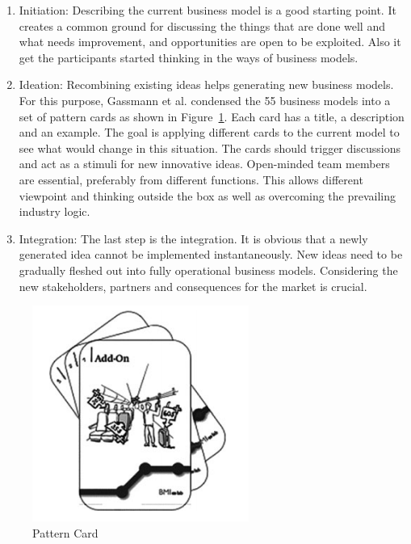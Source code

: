		\begin{enumerate}					
			\item Initiation: Describing the current business model is a good starting point. It creates a common ground for discussing the things that are done well and what needs improvement, and opportunities are open to be exploited. Also it get the participants started thinking in the ways of business models.

			\item Ideation: Recombining existing ideas helps generating new business models. For this purpose, Gassmann et al. condensed the 55 business models into a set of pattern cards as shown in Figure~\ref{fig:pattern_card}. Each card has a title, a description and an example. The goal is applying different cards to the current model to see what would change in this situation. The cards should trigger discussions and act as a stimuli for new innovative ideas. Open-minded team members are essential, preferably from different functions. This allows different viewpoint and thinking outside the box as well as overcoming the prevailing industry logic.
			
			\item Integration: The last step is the integration. It is obvious that a newly generated idea cannot be implemented instantaneously. New ideas need to be gradually fleshed out into fully operational business models. Considering the new stakeholders, partners and consequences for the market is crucial.
		\end{enumerate}

		\begin{figure}[ht]
			    \begin{center}
			    \includegraphics[scale=0.6]{Talk11/Figure2.png}
			    \end{center}
			    \caption{Pattern Card \cite[p. 95]{gassmann55}}
			    \label{fig:pattern_card}
			\end{figure}
